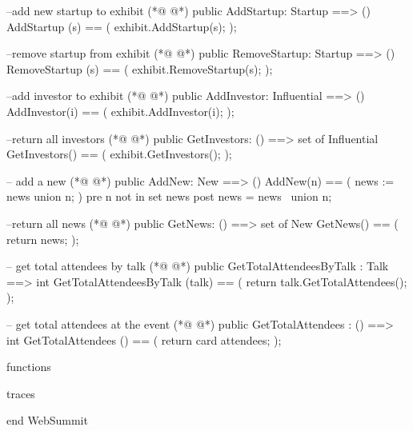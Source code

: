 \begin{vdmpp}[breaklines=true]
  --add new startup to exhibit
(*@
\label{AddStartup:272}
@*)
  public AddStartup: Startup ==> ()
    AddStartup (s) == (
     exhibit.AddStartup(s);
    );
 
  --remove startup from exhibit    
(*@
\label{RemoveStartup:278}
@*)
  public RemoveStartup: Startup ==> ()
    RemoveStartup (s) == (
     exhibit.RemoveStartup(s);
    );
    
  --add investor to exhibit
(*@
\label{AddInvestor:284}
@*)
  public AddInvestor: Influential ==> ()
   AddInvestor(i) == (
    exhibit.AddInvestor(i);
   );
  
  --return all investors
(*@
\label{GetInvestors:290}
@*)
  public GetInvestors: () ==> set of Influential
   GetInvestors() == (
    exhibit.GetInvestors();
   ); 
  
  -- add a new
(*@
\label{AddNew:296}
@*)
  public AddNew: New ==> ()
   AddNew(n) == (
    news := news union {n};
    )
    pre n not in set news
   post news = news~ union {n};
  
  --return all news
(*@
\label{GetNews:304}
@*)
  public GetNews: () ==> set of New
   GetNews() == (
    return news;
   );
   
  -- get total attendees by talk 
(*@
\label{GetTotalAttendeesByTalk:310}
@*)
  public GetTotalAttendeesByTalk : Talk ==> int
   GetTotalAttendeesByTalk (talk) == (
    return talk.GetTotalAttendees();
   );  
   
  -- get total attendees at the event 
(*@
\label{GetTotalAttendees:316}
@*)
  public GetTotalAttendees : () ==> int
   GetTotalAttendees () == (
    return card attendees;
   );
  
functions

traces

end WebSummit
\end{vdmpp}
\bigskip
